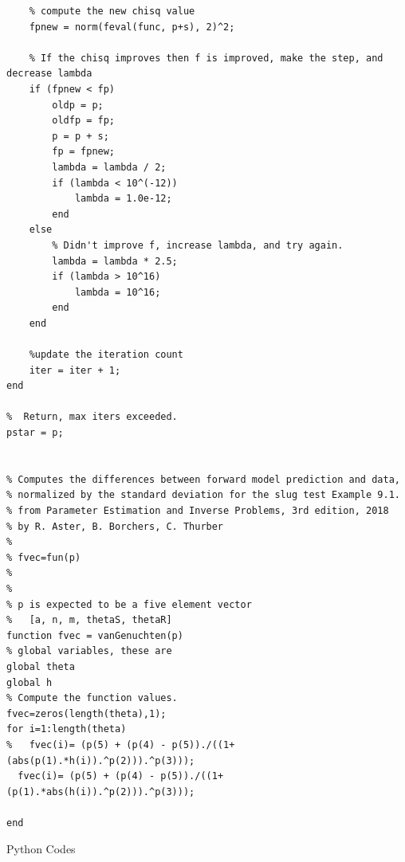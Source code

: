 \documentclass{article}
\begin{document}
\begin{verbatim}
    % compute the new chisq value
    fpnew = norm(feval(func, p+s), 2)^2;
    
    % If the chisq improves then f is improved, make the step, and decrease lambda
    if (fpnew < fp)
        oldp = p;
        oldfp = fp;
        p = p + s;
        fp = fpnew;
        lambda = lambda / 2;
        if (lambda < 10^(-12))
            lambda = 1.0e-12;
        end
    else
        % Didn't improve f, increase lambda, and try again.
        lambda = lambda * 2.5;
        if (lambda > 10^16)
            lambda = 10^16;
        end
    end
    
    %update the iteration count
    iter = iter + 1;
end

%  Return, max iters exceeded.
pstar = p;


% Computes the differences between forward model prediction and data,
% normalized by the standard deviation for the slug test Example 9.1.
% from Parameter Estimation and Inverse Problems, 3rd edition, 2018
% by R. Aster, B. Borchers, C. Thurber
%
% fvec=fun(p)
%
%
% p is expected to be a five element vector
%   [a, n, m, thetaS, thetaR]
function fvec = vanGenuchten(p)
% global variables, these are 
global theta
global h
% Compute the function values.
fvec=zeros(length(theta),1);
for i=1:length(theta)
%   fvec(i)= (p(5) + (p(4) - p(5))./((1+(abs(p(1).*h(i)).^p(2))).^p(3)));
  fvec(i)= (p(5) + (p(4) - p(5))./((1+(p(1).*abs(h(i)).^p(2))).^p(3)));

end  

\end{verbatim}

\newpage
Python Codes
\end{document}
